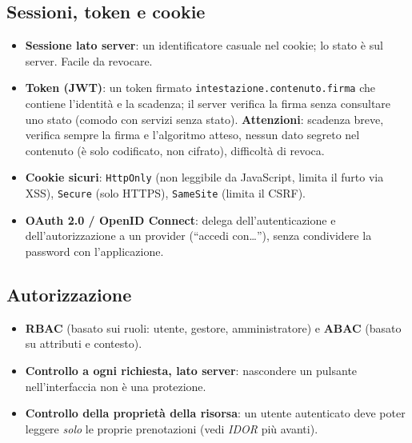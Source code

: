 \subsection{Sessioni, token e cookie}
\begin{itemize}
    \item \textbf{Sessione lato server}: un identificatore casuale nel cookie; lo stato è sul server. Facile da revocare.
    \item \textbf{Token (JWT)}: un token firmato \texttt{intestazione.contenuto.firma} che contiene l'identità e la scadenza; il server verifica la firma senza consultare uno stato (comodo con servizi senza stato). \textbf{Attenzioni}: scadenza breve, verifica sempre la firma e l'algoritmo atteso, nessun dato segreto nel contenuto (è solo codificato, non cifrato), difficoltà di revoca.
    \item \textbf{Cookie sicuri}: \texttt{HttpOnly} (non leggibile da JavaScript, limita il furto via XSS), \texttt{Secure} (solo HTTPS), \texttt{SameSite} (limita il CSRF).
    \item \textbf{OAuth 2.0 / OpenID Connect}: delega dell'autenticazione e dell'autorizzazione a un provider (``accedi con\ldots''), senza condividere la password con l'applicazione.
\end{itemize}

\subsection{Autorizzazione}
\begin{itemize}
    \item \textbf{RBAC} (basato sui ruoli: utente, gestore, amministratore) e \textbf{ABAC} (basato su attributi e contesto).
    \item \textbf{Controllo a ogni richiesta, lato server}: nascondere un pulsante nell'interfaccia non è una protezione.
    \item \textbf{Controllo della proprietà della risorsa}: un utente autenticato deve poter leggere \emph{solo} le proprie prenotazioni (vedi \emph{IDOR} più avanti).
\end{itemize}

